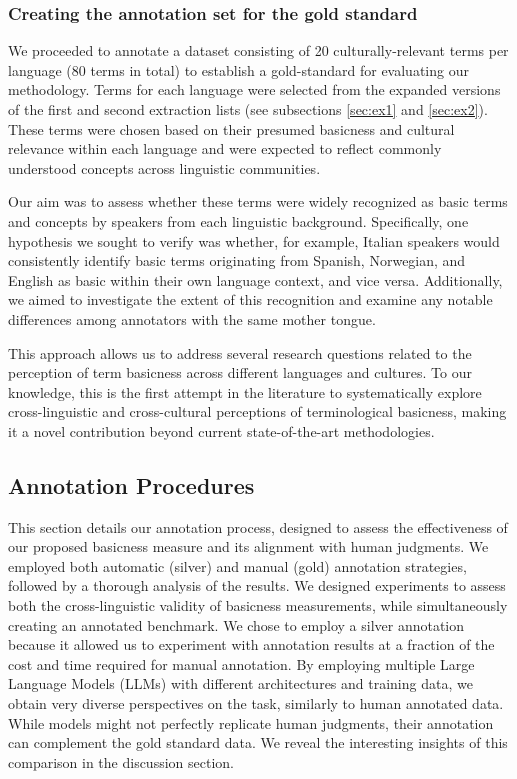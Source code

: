 \documentclass[preprint,12pt,authoryear]{elsarticle}
\begin{document}
\subsubsection{Creating the annotation set for the gold standard}

We proceeded to annotate a dataset consisting of 20 culturally-relevant terms per language (80 terms in total) to establish a gold-standard for evaluating our methodology. Terms for each language were selected from the expanded versions of the first and second extraction lists (see subsections \ref{sec:ex1} and \ref{sec:ex2}). These terms were chosen based on their presumed basicness and cultural relevance within each language and were expected to reflect commonly understood concepts across linguistic communities.

Our aim was to assess whether these terms were widely recognized as basic terms and concepts by speakers from each linguistic background. Specifically, one hypothesis we sought to verify was whether, for example, Italian speakers would consistently identify basic terms originating from Spanish, Norwegian, and English as basic within their own language context, and vice versa. Additionally, we aimed to investigate the extent of this recognition and examine any notable differences among annotators with the same mother tongue.

This approach allows us to address several research questions related to the perception of term basicness across different languages and cultures. To our knowledge, this is the first attempt in the literature to systematically explore cross-linguistic and cross-cultural perceptions of terminological basicness, making it a novel contribution beyond current state-of-the-art methodologies.

\subsection{Annotation Procedures}

This section details our annotation process, designed to assess the effectiveness of our proposed basicness measure and its alignment with human judgments. We employed both automatic (silver) and manual (gold) annotation strategies, followed by a thorough analysis of the results. We designed experiments to assess both the cross-linguistic validity of basicness measurements, while simultaneously creating an annotated benchmark. We chose to employ a silver annotation \cite{tan_large_2024} because it allowed us to experiment with annotation results at a fraction of the cost and time required for manual annotation. By employing multiple Large Language Models (LLMs) with different architectures and training data, we obtain very diverse perspectives on the task, similarly to human annotated data. While models might not perfectly replicate human judgments, their annotation can complement the gold standard data. We reveal the interesting insights of this comparison in the discussion section.
\end{document}
